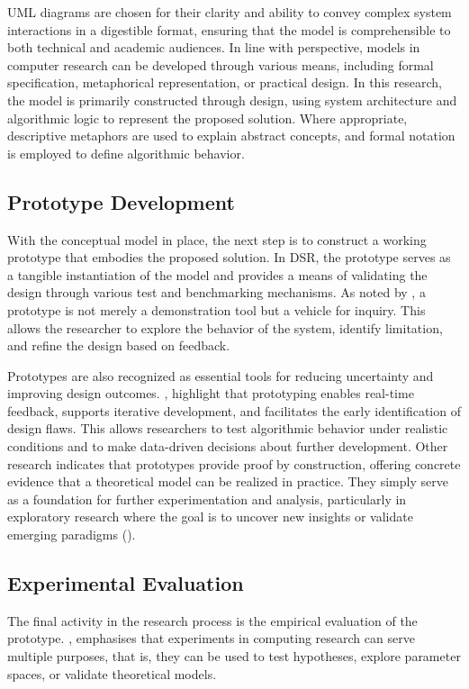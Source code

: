\noindent UML diagrams are chosen for their clarity and ability to convey complex system interactions in a digestible format, ensuring that the model is comprehensible to both technical and academic audiences. In line with \cite{olivier2009information} perspective, models in computer research can be developed through various means, including formal specification, metaphorical representation, or practical design. In this research, the model is primarily constructed through design, using system architecture and algorithmic logic to represent the proposed solution. Where appropriate, descriptive metaphors are used to explain abstract concepts, and formal notation is employed to define algorithmic behavior.

\subsection{Prototype Development}
With the conceptual model in place, the next step is to construct a working prototype that embodies the proposed solution. In DSR, the prototype serves as a tangible instantiation of the model and provides a means of validating the design through various test and benchmarking mechanisms. As noted by \cite{olivier2009information}, a prototype is not merely a demonstration tool but a vehicle for inquiry. This allows the researcher to explore the behavior of the system, identify limitation, and refine the design based on feedback.

\parbreak

\noindent Prototypes are also recognized as essential tools for reducing uncertainty and improving design outcomes. \cite{camburn2017design}, highlight that prototyping enables real-time feedback, supports iterative development, and facilitates the early identification of design flaws. This allows researchers to test algorithmic behavior under realistic conditions and to make data-driven decisions about further development. Other research indicates that prototypes provide proof by construction, offering concrete evidence that a theoretical model can be realized in practice. They simply serve as a foundation for further experimentation and analysis, particularly in exploratory research where the goal is to uncover new insights or validate emerging paradigms (\cite{nunamaker1990systems}).

\subsection{Experimental Evaluation}
The final activity in the research process is the empirical evaluation of the prototype. \cite{olivier2009information}, emphasises that experiments in computing research can serve multiple purposes, that is, they can be used to test hypotheses, explore parameter spaces, or validate theoretical models.

